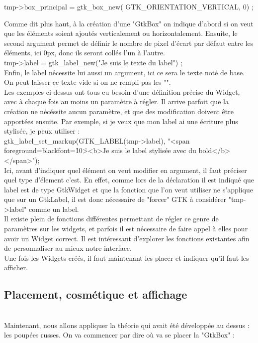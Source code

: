 \documentclass[11pt,french,a4paper]{report}
\begin{document}
tmp->box\_principal = gtk\_box\_new( GTK\_ORIENTATION\_VERTICAL, 0) ;

Comme dit plus haut, à la création d'une "GtkBox" on indique d'abord si on veut que les éléments soient ajoutés verticalement 
ou horizontalement. Ensuite, le second argument permet de définir le nombre de pixel d'écart par défaut entre les éléments, 
ici 0px, donc ils seront collés l'un à l'autre.  \\

tmp->label = gtk\_label\_new("Je suis le texte du label") ; \\
Enfin, le label nécessite lui aussi un argument, ici ce sera le texte noté de base. 
On peut laisser ce texte vide si on ne rempli pas les "".  \\


Les exemples ci-dessus ont tous eu besoin d'une définition précise du Widget, avec à chaque fois au moins un paramètre à régler. 
Il arrive parfoit que la création ne nécéssite aucun paramètre, et que des modification doivent être apportées ensuite. 
Par exemple, si je veux que mon label ai une écriture plus stylisée, je peux utiliser :  \\

gtk\_label\_set\_markup(GTK\_LABEL(tmp->label), "<span foreground=\"black\" font=\"10\"><b>Je suis le label stylisée avec du bold</b></span>"); \\

Ici, avant d'indiquer quel élément on veut modifier en argument, il faut préciser quel type d'élement c'est.
En effet, comme lors de la déclaration il est indiqué que label est de type GtkWidget et que la fonction que l'on veut utiliser 
ne s'applique que sur un GtkLabel, il est donc nécessaire de "forcer" GTK à considérer "tmp->label" comme un label.\\

Il existe plein de fonctions différentes permettant de régler ce genre de paramètres sur les widgets, et parfois il est nécessaire 
de faire appel à elles pour avoir un Widget correct. 
Il est intéressant d'explorer les fonctions existantes afin de personnaliser au mieux notre interface. \\

Une fois les Widgets créés, il faut maintenant les placer et indiquer qu'il faut les afficher. \\ 
 
\subsection{Placement, cosmétique et affichage} \\
Maintenant, nous allons appliquer la théorie qui avait été développée au dessus : les poupées russes. On va commencer par dire où 
va se placer la "GtkBox" : \\
\end{document}
